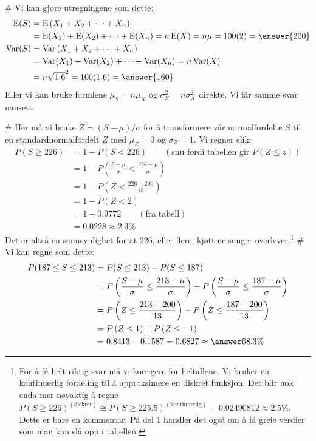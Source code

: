 \begin{easylist}[enumerate]
	
	# Vi kan gjøre utregningene som dette:
	\begin{align*}
		\operatorname{E}(S) &= \operatorname{E}\left(X_1 + X_2 + \dots + X_n\right) \\
		&= \operatorname{E}(X_1) + \operatorname{E}(X_2) + \dots +  \operatorname{E}(X_n) = n \operatorname{E}(X) = n\mu = 100(2) = \answer{200} \\
		\operatorname{Var}(S) &= \operatorname{Var}\left(X_1 + X_2 + \dots + X_n\right) \\
		&= \operatorname{Var}(X_1) + \operatorname{Var}(X_2) + \dots +  \operatorname{Var}(X_n) = n \operatorname{Var}(X) \\ &= n \sqrt{1.6}^2 = 100(1.6) = \answer{160}
	\end{align*}
	Eller vi kan bruke formlene $\mu_S = n \mu_X$ og $\sigma_S^2 = n \sigma_X^2$ direkte.
	Vi får samme svar uansett.
	
	# Her må vi bruke $Z = (S-\mu)/\sigma$ for å transformere vår normalfordelte $S$
	til en standardnormalfordelt $Z$ med $\mu_Z = 0$ og $\sigma_Z = 1$. Vi regner slik:
	\begin{align*}
		P(S \geq 226) &= 1 - P(S < 226) \qquad (\text{snu fordi tabellen gir }P(Z \leq z)) \\
							&= 1 - P \left(\frac{S-\mu}{\sigma} < \frac{226-\mu}{\sigma}\right) \\
							&= 1 - P \left(Z < \frac{226-200}{13}\right) \\
							&= 1 - P \left(Z < 2\right) \\
							&= 1 - 0.9772  \qquad (\text{fra tabell})\\
							&= 0.0228 \approx 2.3 \%
	\end{align*}
	Det er altså en  sannsynlighet for at 226, eller flere, kjøttmeisunger overlever.\footnote{For å få helt riktig svar må vi korrigere for heltallene. Vi bruker en kontinuerlig fordeling til å approksimere en diskret funksjon. Det blir nok enda mer nøyaktig å regne $P(S \geq 226)^{(\text{diskret})} \cong P(S \geq 225.5)^{(\text{kontinuerlig})} = 0.02490812 \approx 2.5 \%$. Dette er bare en kommentar. På del 1 handler det også om å få greie verdier som man kan slå opp i tabellen.}
	# Vi kan regne som dette:
	\begin{align*}
		P(187 \leq S \leq 213) &= P(S \leq 213) - P(S \leq 187) \\
		&= P \left(\frac{S-\mu}{\sigma} \leq \frac{213-\mu}{\sigma}\right) - 
		P \left(\frac{S-\mu}{\sigma} \leq \frac{187-\mu}{\sigma}\right) \\
		&= P \left(Z \leq \frac{213-200}{13}\right) - 
		P \left(Z \leq \frac{187-200}{13}\right) \\
		&= P \left(Z \leq 1\right) - 
		P \left(Z \leq -1\right) \\
		&= 0.8413 - 
		0.1587 =  0.6827 \approx \answer{68.3\%}
	\end{align*}
\end{easylist}



